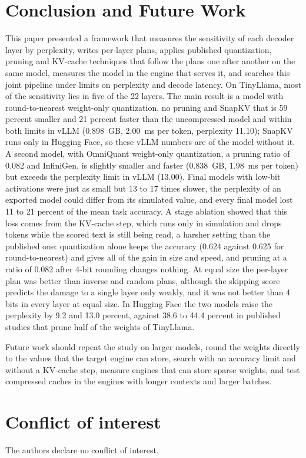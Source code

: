 \documentclass[num-refs]{wiley-article}
\begin{document}
\section{Conclusion and Future Work}
\label{sec:conclusion}

This paper presented a framework that measures the sensitivity of each decoder layer by perplexity, writes per-layer plans, applies published quantization, pruning and KV-cache techniques that follow the plans one after another on the same model, measures the model in the engine that serves it, and searches this joint pipeline under limits on perplexity and decode latency. On TinyLlama, most of the sensitivity lies in five of the 22 layers. The main result is a model with round-to-nearest weight-only quantization, no pruning and SnapKV that is 59 percent smaller and 21 percent faster than the uncompressed model and within both limits in vLLM (0.898~GB, 2.00~ms per token, perplexity 11.10); SnapKV runs only in Hugging Face, so these vLLM numbers are of the model without it. A second model, with OmniQuant weight-only quantization, a pruning ratio of 0.082 and InfiniGen, is slightly smaller and faster (0.838~GB, 1.98~ms per token) but exceeds the perplexity limit in vLLM (13.00). Final models with low-bit activations were just as small but 13 to 17 times slower, the perplexity of an exported model could differ from its simulated value, and every final model lost 11 to 21 percent of the mean task accuracy. A stage ablation showed that this loss comes from the KV-cache step, which runs only in simulation and drops tokens while the scored text is still being read, a harsher setting than the published one: quantization alone keeps the accuracy (0.624 against 0.625 for round-to-nearest) and gives all of the gain in size and speed, and pruning at a ratio of 0.082 after 4-bit rounding changes nothing. At equal size the per-layer plan was better than inverse and random plans, although the skipping score predicts the damage to a single layer only weakly, and it was not better than 4 bits in every layer at equal size. In Hugging Face the two models raise the perplexity by 9.2 and 13.0 percent, against 38.6 to 44.4 percent in published studies that prune half of the weights of TinyLlama.

Future work should repeat the study on larger models, round the weights directly to the values that the target engine can store, search with an accuracy limit and without a KV-cache step, measure engines that can store sparse weights, and test compressed caches in the engines with longer contexts and larger batches.

\section*{Conflict of interest}

The authors declare no conflict of interest.


\end{document}
